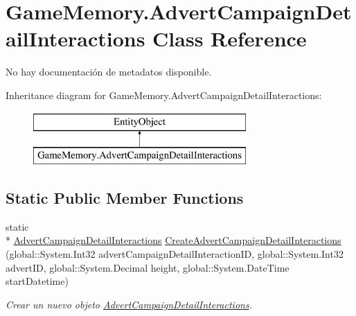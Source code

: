 \hypertarget{class_game_memory_1_1_advert_campaign_detail_interactions}{\section{Game\-Memory.\-Advert\-Campaign\-Detail\-Interactions Class Reference}
\label{class_game_memory_1_1_advert_campaign_detail_interactions}
}


No hay documentación de metadatos disponible.  


Inheritance diagram for Game\-Memory.\-Advert\-Campaign\-Detail\-Interactions\-:\begin{figure}[H]
\begin{center}
\leavevmode
\includegraphics[height=2.000000cm]{class_game_memory_1_1_advert_campaign_detail_interactions}
\end{center}
\end{figure}
\subsection*{Static Public Member Functions}
\begin{DoxyCompactItemize}
\item 
static \\*
\hyperlink{class_game_memory_1_1_advert_campaign_detail_interactions}{Advert\-Campaign\-Detail\-Interactions} \hyperlink{class_game_memory_1_1_advert_campaign_detail_interactions_a7c7b61fe7159631078beba2c27b9d556}{Create\-Advert\-Campaign\-Detail\-Interactions} (global\-::\-System.\-Int32 advert\-Campaign\-Detail\-Interaction\-I\-D, global\-::\-System.\-Int32 advert\-I\-D, global\-::\-System.\-Decimal height, global\-::\-System.\-Date\-Time start\-Datetime)
\begin{DoxyCompactList}\small\item\em Crear un nuevo objeto \hyperlink{class_game_memory_1_1_advert_campaign_detail_interactions}{Advert\-Campaign\-Detail\-Interactions}. \end{DoxyCompactList}\end{DoxyCompactItemize}

